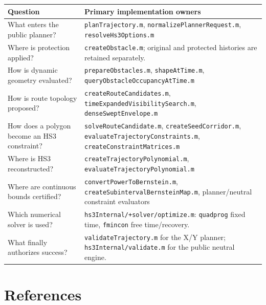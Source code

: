 \documentclass[10pt,letterpaper]{article}
\newcommand{\file}[1]{\nolinkurl{#1}}
\begin{document}
\begin{longtable}{@{}p{.28\linewidth}p{.64\linewidth}@{}}
\toprule
Question & Primary implementation owners \\
\midrule
\endhead
What enters the public planner? & \file{planTrajectory.m},
\file{normalizePlannerRequest.m}, \file{resolveHs3Options.m} \\
Where is protection applied? & \file{createObstacle.m}; original and protected
histories are retained separately. \\
How is dynamic geometry evaluated? & \file{prepareObstacles.m},
\file{shapeAtTime.m}, \file{queryObstacleOccupancyAtTime.m} \\
How is route topology proposed? & \file{createRouteCandidates.m},
\file{timeExpandedVisibilitySearch.m}, \file{denseSweptEnvelope.m} \\
How does a polygon become an HS3 constraint? &
\file{solveRouteCandidate.m}, \file{createSeedCorridor.m},
\file{evaluateTrajectoryConstraints.m}, \file{createConstraintMatrices.m} \\
Where is HS3 reconstructed? & \file{createTrajectoryPolynomial.m},
\file{evaluateTrajectoryPolynomial.m} \\
Where are continuous bounds certified? & \file{convertPowerToBernstein.m},
\file{createSubintervalBernsteinMap.m}, planner/neutral constraint evaluators \\
Which numerical solver is used? & \file{hs3Internal/+solver/optimize.m}:
\file{quadprog} fixed time, \file{fmincon} free time/recovery. \\
What finally authorizes success? & \file{validateTrajectory.m} for the X/Y
planner; \file{hs3Internal/validate.m} for the public neutral engine. \\
\bottomrule
\end{longtable}

\section{References}
\end{document}
